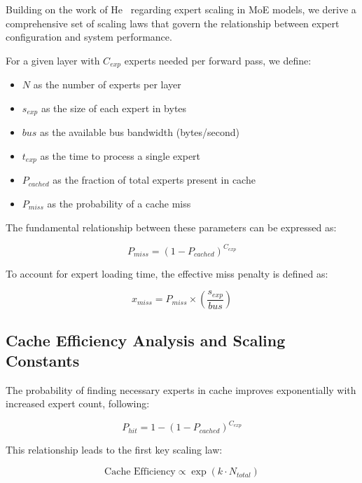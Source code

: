 \documentclass[11pt]{article}
\begin{document}
Building on the work of He~\cite{he2024} regarding expert scaling in MoE models, we derive a comprehensive set of scaling laws that govern the relationship between expert configuration and system performance.

For a given layer with $C_{exp}$ experts needed per forward pass, we define:

\begin{itemize}
    \item $N$ as the number of experts per layer
    \item $s_{exp}$ as the size of each expert in bytes
    \item $bus$ as the available bus bandwidth (bytes/second)
    \item $t_{exp}$ as the time to process a single expert
    \item $P_{cached}$ as the fraction of total experts present in cache
    \item $P_{miss}$ as the probability of a cache miss
\end{itemize}

The fundamental relationship between these parameters can be expressed as:

\begin{equation}
P_{miss} = (1 - P_{cached})^{C_{exp}}
\end{equation}

To account for expert loading time, the effective miss penalty is defined as:

\begin{equation}
x_{miss} = P_{miss} \times \left(\frac{s_{exp}}{bus}\right)
\end{equation}

\subsection{Cache Efficiency Analysis and Scaling Constants}

The probability of finding necessary experts in cache improves exponentially with increased expert count, following:

\begin{equation}
P_{hit} = 1 - (1 - P_{cached})^{C_{exp}}
\end{equation}

This relationship leads to the first key scaling law:

\begin{equation}
\text{Cache Efficiency} \propto \exp(k \cdot N_{total})
\end{equation}
\end{document}
